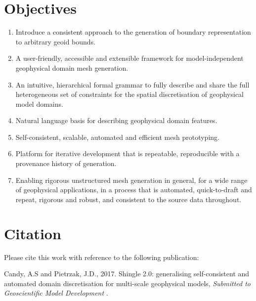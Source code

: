 \documentclass[a4paper, 10pt]{book}
\providecommand{\dotbrml}{\texttt{.brml}\xspace}
\begin{document}
\section{Objectives}
\begin{enumerate}
\setlength{\itemsep}{1pt}\setlength{\parskip}{0pt}\setlength{\parsep}{0pt}
\item Introduce a consistent approach to the generation of boundary representation to arbitrary geoid bounds.
\item A user-friendly, accessible and extensible framework for model-independent geophysical domain mesh generation.
\item An intuitive, hierarchical formal grammar to fully describe and share the full heterogeneous set of constraints for the spatial discretisation of geophysical model domains.
\item Natural language basis for describing geophysical domain features.
\item Self-consistent, scalable, automated and efficient mesh prototyping.
\item Platform for iterative development that is repeatable, reproducible with a provenance history of generation.
\item Enabling rigorous unstructured mesh generation in general, for a wide range of geophysical applications, in a process that is automated, quick-to-draft and repeat, rigorous and robust, and consistent to the source data throughout.
\end{enumerate}

\clearpage
\section{Citation}
\label{sec:citations}
Please cite this work with reference to the following publication:
\par\vskip 4pt\noindent\hspace{0.02\columnwidth}%
\begin{minipage}{0.9\columnwidth}%
Candy, A.S and Pietrzak, J.D., 2017. Shingle 2.0: generalising self-consistent and automated domain discretisation for multi-scale geophysical models, \emph{Submitted to Geoscientific Model Development} \citep{candyshingle}.
\end{minipage}
\\
\end{document}
